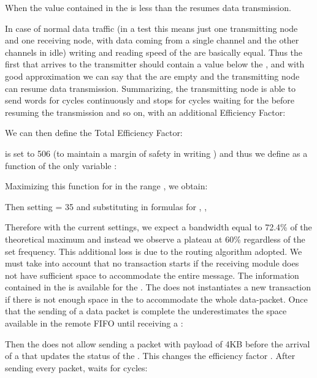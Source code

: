 When the value contained in the \credit is less than  the
 resumes data transmission.

In case of normal data traffic (in a test this means just one
transmitting node and one receiving node, with data coming from a
single channel and the other channels in idle) writing and reading
speed of the  are basically equal. Thus the first
\credit that arrives to the transmitter should contain a value below
the , and with good approximation we can say that the
 are empty and the transmitting node can resume data
transmission.
Summarizing, the transmitting node is able to send words for 
cycles continuously and stops for  cycles waiting for the \credit
before resuming the transmission and so on, with an additional
Efficiency Factor:




We can then define the Total Efficiency Factor:




 is set to 506 (to maintain a margin of safety in writing
) and thus we define  as a function of the only
variable :




Maximizing this function for  in the range , we obtain:




Then setting  = 35 and substituting in formulas for ,
, 










Therefore with the current settings, we expect a bandwidth equal to
72.4\% of the theoretical maximum and instead we observe a plateau at
60\% regardless of the set frequency.
This additional loss is due to the routing algorithm adopted. We must
take into account that no transaction starts if the receiving module
does not have sufficient space to accommodate the entire message.
The information contained in the \credit is available for the
. The  does not instantiates a new transaction
if there is not enough space in the  to accommodate
the whole data-packet. Once that the sending of a data packet is
complete the  underestimates the space available in the
remote FIFO until receiving a \credit:




Then the  does not allow sending a packet with payload of
4KB before the arrival of a \credit that updates the status of the
.
This changes the efficiency factor . After sending every
packet,  waits for  cycles:




